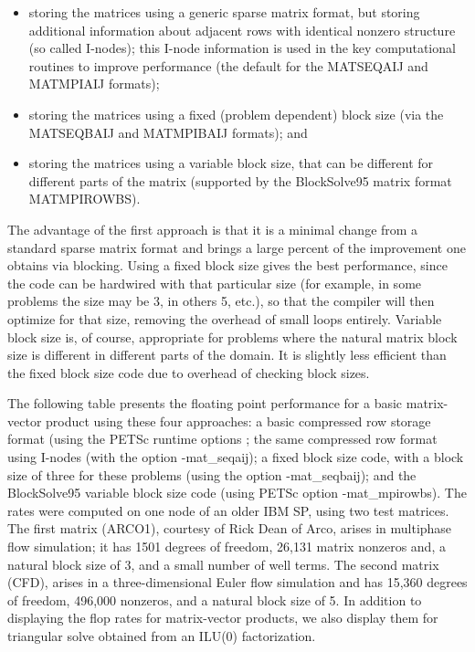 \documentclass[twoside,12pt]{../sty/report_petsc}
\begin{document}
\begin{itemize}
\item storing the matrices using a generic sparse matrix format, but 
   storing additional information about adjacent rows with identical 
   nonzero structure (so called I-nodes); this I-node information is 
   used in the key computational routines to improve performance
   (the default for the MATSEQAIJ and MATMPIAIJ formats);
\item storing the matrices using a fixed (problem dependent) block size
   (via the MATSEQBAIJ and MATMPIBAIJ formats); and
\item storing the matrices using a variable block size, that can be 
   different for different parts of the matrix
   (supported by the BlockSolve95 matrix format MATMPIROWBS).
\end{itemize}

The advantage of the first approach is that it is a minimal change
from a standard sparse matrix format and brings a large percent of the
improvement one obtains via blocking.  Using a fixed block size gives
the best performance, since the code can be hardwired with that
particular size (for example, in some problems the size may be 3, in
others 5, etc.), so that the compiler will then optimize for that
size, removing the overhead of small loops entirely. Variable block
size is, of course, appropriate for problems where the natural matrix
block size is different in different parts of the domain. It is
slightly less efficient than the fixed block size code due to overhead
of checking block sizes.

The following table presents the floating point performance
for a basic matrix-vector product using these four approaches: a basic
compressed row storage format (using the PETSc runtime options 
; the same compressed row format using
I-nodes (with the option {-mat\_seqaij}); a fixed block size code,
with a block size of three for these problems (using the option 
{-mat\_seqbaij}); and the BlockSolve95 variable block size code (using
PETSc option {-mat\_mpirowbs}). The rates were computed on one
node of an older IBM SP, using two test matrices.  The first matrix
(ARCO1), courtesy of Rick Dean of Arco, arises in multiphase flow
simulation; it has 1501 degrees of freedom, 26,131 matrix nonzeros
and, a natural block size of 3, and a small number of well terms. The
second matrix (CFD), arises in a three-dimensional Euler flow
simulation and has 15,360 degrees of freedom, 496,000 nonzeros, and a
natural block size of 5. In addition to displaying the flop rates for
matrix-vector products, we also display them for triangular solve
obtained from an ILU(0) factorization.
\end{document}
